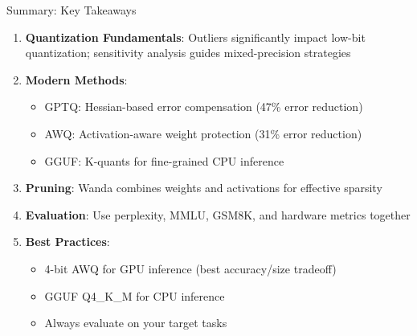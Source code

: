 \documentclass[aspectratio=169,10pt]{beamer}
\begin{document}
\begin{frame}{Summary: Key Takeaways}
    \begin{enumerate}
        \item \textbf{Quantization Fundamentals}: Outliers significantly impact low-bit quantization; sensitivity analysis guides mixed-precision strategies

        \item \textbf{Modern Methods}:
        \begin{itemize}
            \item GPTQ: Hessian-based error compensation (47\% error reduction)
            \item AWQ: Activation-aware weight protection (31\% error reduction)
            \item GGUF: K-quants for fine-grained CPU inference
        \end{itemize}

        \item \textbf{Pruning}: Wanda combines weights and activations for effective sparsity

        \item \textbf{Evaluation}: Use perplexity, MMLU, GSM8K, and hardware metrics together

        \item \textbf{Best Practices}:
        \begin{itemize}
            \item 4-bit AWQ for GPU inference (best accuracy/size tradeoff)
            \item GGUF Q4\_K\_M for CPU inference
            \item Always evaluate on your target tasks
        \end{itemize}
    \end{enumerate}
\end{frame}
\end{document}
